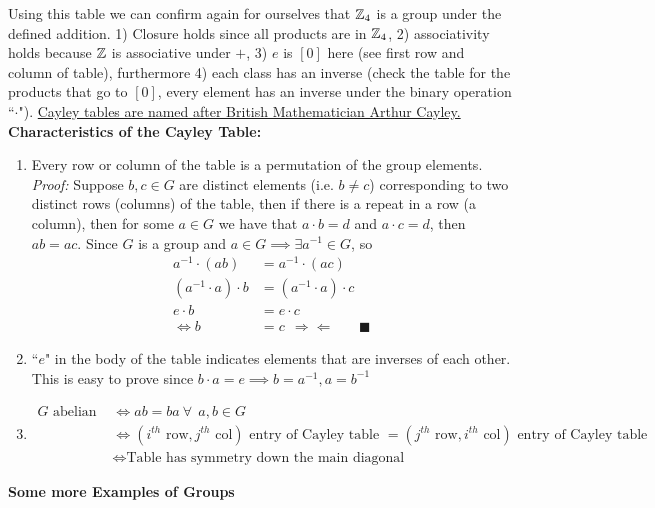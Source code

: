 Using this table we can confirm again for ourselves that ${\mathbb{Z}}_4$ is a group under the defined
addition. 1) Closure holds since all products are in ${\mathbb{Z}}_4$, 2) associativity holds because ${\mathbb{Z}}$ is
associative under $+$, 3) $e$ is $[0]$ here (see first row and column of table), furthermore 4) each
class has an inverse (check the table for the products that go to $[0]$, every element has an
inverse under the binary operation ``$\cdot$").
\href{https://en.wikipedia.org/wiki/Arthur_Cayley}{Cayley tables are named after British
Mathematician Arthur Cayley.}\\
\newpage
\noindent\textbf{Characteristics of the Cayley Table:}
\begin{enumerate}
    \item Every row or column of the table is a permutation of the group elements.\\
    \textit{Proof:} Suppose $b,c\in G$ are distinct elements (i.e. $b\neq c$) corresponding to two
    distinct rows (columns) of the table, then if there is a repeat in a row (a column), then for
    some $a\in G$ we have that $a\cdot b=d$ and $a\cdot c=d$, then $ab=ac$. Since $G$ is a group and
    $a\in G \implies \exists a^{-1}\in G $, so
    \begin{align}
        a^{-1}\cdot (ab)&=a^{-1}\cdot (ac) \nonumber \\
        (a^{-1}\cdot a)\cdot b&=(a^{-1}\cdot a)\cdot c \nonumber \\
        e\cdot b&=e\cdot c \nonumber \\
        \iff b&=c \ \ \Rightarrow\Leftarrow \ \ \ \ \ \ \ \ \blacksquare \nonumber
    \end{align}
    \item ``$e$" in the body of the table indicates elements that are inverses of each other. This
    is easy to prove since $b\cdot a= e \implies b=a^{-1}, a=b^{-1} $
    \item \begin{align}
        G \text{ abelian } &\iff ab=ba \ \forall \ \ a,b \in G \nonumber \\
        &\iff (i^{th} \text{ row}, j^{th} \text{ col}) \text{ entry of Cayley table } = (j^{th} \text{ row}, i^{th} \text{ col}) \text{ entry of Cayley table } \nonumber \\
        &\iff \text{Table has symmetry down the main diagonal} \nonumber
    \end{align}
\end{enumerate}

\noindent\textbf{Some more Examples of Groups}

